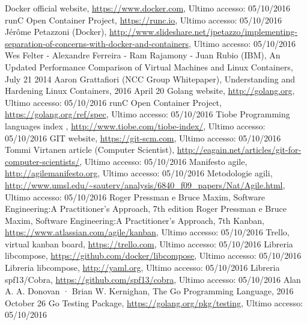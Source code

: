 \begin{thebibliography}{99}
\raggedright
 Docker official website, \url{https://www.docker.com}, Ultimo accesso: 05/10/2016
 runC Open Container Project, \url{https://runc.io}, Ultimo accesso: 05/10/2016
 Jérôme Petazzoni (Docker), \url{http://www.slideshare.net/jpetazzo/implementing-separation-of-concerns-with-docker-and-containers}, Ultimo accesso: 05/10/2016
 Wes Felter - Alexandre Ferreira - Ram Rajamony - Juan Rubio (IBM), An Updated Performance Comparison of Virtual Machines and Linux Containers, July 21 2014
 Aaron Grattafiori (NCC Group Whitepaper), Understanding and Hardening Linux Containers, 2016 April 20
 Golang website, \url{http://golang.org}, Ultimo accesso: 05/10/2016
 runC Open Container Project, \url{https://golang.org/ref/spec}, Ultimo accesso: 05/10/2016
 Tiobe Programming languages index , \url{http://www.tiobe.com/tiobe-index/}, Ultimo accesso: 05/10/2016
 GIT website, \url{https://git-scm.com}, Ultimo accesso: 05/10/2016
 Tommi Virtanen article (Computer Scientist), \url{http://eagain.net/articles/git-for-computer-scientists/}, Ultimo accesso: 05/10/2016
 Manifesto agile, \url{http://agilemanifesto.org}, Ultimo accesso: 05/10/2016
 Metodologie agili, \url{http://www.umsl.edu/~sauterv/analysis/6840_f09_papers/Nat/Agile.html}, Ultimo accesso: 05/10/2016
  Roger Pressman e Bruce Maxim, Software Engineering:A Practitioner's Approach, 7th edition
  Roger Pressman e Bruce Maxim, Software Engineering:A Practitioner's Approach, 7th
 Kanban, \url{https://www.atlassian.com/agile/kanban}, Ultimo accesso: 05/10/2016
 Trello, virtual kanban board, \url{https://trello.com}, Ultimo accesso: 05/10/2016
 Libreria libcompose, \url{https://github.com/docker/libcompose}, Ultimo accesso: 05/10/2016
 Libreria libcompose, \url{http://yaml.org}, Ultimo accesso: 05/10/2016
 Libreria spf13/Cobra, \url{https://github.com/spf13/cobra}, Ultimo accesso: 05/10/2016
 Alan A. A. Donovan · Brian W. Kernighan, The Go Programming Language, 2016 October 26
 Go Testing Package, \url{https://golang.org/pkg/testing}, Ultimo accesso: 05/10/2016




\end{thebibliography}
